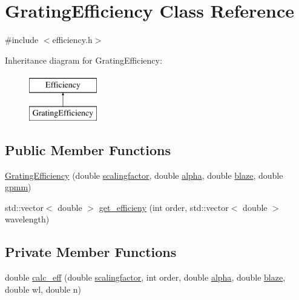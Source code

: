 \hypertarget{class_grating_efficiency}{}\section{Grating\+Efficiency Class Reference}
\label{class_grating_efficiency}


{\ttfamily \#include $<$efficiency.\+h$>$}

Inheritance diagram for Grating\+Efficiency\+:\begin{figure}[H]
\begin{center}
\leavevmode
\includegraphics[height=2.000000cm]{class_grating_efficiency}
\end{center}
\end{figure}
\subsection*{Public Member Functions}
\begin{DoxyCompactItemize}
\item 
\hyperlink{class_grating_efficiency_a2c12fab8a296d57531239d9f653f57d7}{Grating\+Efficiency} (double \hyperlink{class_grating_efficiency_af452d057f148d401e9f2072e3752e0a4}{scalingfactor}, double \hyperlink{class_grating_efficiency_abb5fb732555147e8f977487d3a234c51}{alpha}, double \hyperlink{class_grating_efficiency_a541aa917f023bbb38025c271e3060d31}{blaze}, double \hyperlink{class_grating_efficiency_a3bbe348499e4b3d6792a2f8ecaca1f94}{gpmm})
\item 
std\+::vector$<$ double $>$ \hyperlink{class_grating_efficiency_a0d0126c4618dbf976385d0126415195f}{get\+\_\+efficieny} (int order, std\+::vector$<$ double $>$ wavelength)
\end{DoxyCompactItemize}
\subsection*{Private Member Functions}
\begin{DoxyCompactItemize}
\item 
double \hyperlink{class_grating_efficiency_a446eeb236e57ede246e96ebd863fa645}{calc\+\_\+eff} (double \hyperlink{class_grating_efficiency_af452d057f148d401e9f2072e3752e0a4}{scalingfactor}, int order, double \hyperlink{class_grating_efficiency_abb5fb732555147e8f977487d3a234c51}{alpha}, double \hyperlink{class_grating_efficiency_a541aa917f023bbb38025c271e3060d31}{blaze}, double wl, double n)
\end{DoxyCompactItemize}
